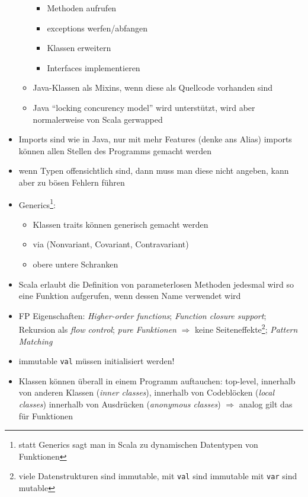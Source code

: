 \begin{itemize}
\begin{itemize}
\begin{itemize}
      \item Methoden aufrufen
      \item exceptions werfen/abfangen
      \item Klassen erweitern
      \item Interfaces implementieren
    \end{itemize}    
    \item Java-Klassen als Mixins, wenn diese als Quellcode vorhanden
    sind
    \item Java \enquote{locking \und concurency model} wird unterstützt, wird
    aber normalerweise von Scala gerwapped
  \end{itemize}
  \item Imports sind wie in Java, nur mit mehr Features (denke ans
  Alias) \und imports können allen Stellen des Programms gemacht werden
  \item wenn Typen offensichtlich sind, dann muss man diese nicht angeben, kann
  aber zu bösen Fehlern führen
  \item Generics\footnote{statt Generics sagt man in Scala zu 
  dynamischen Datentypen von Funktionen }:
  \begin{itemize}
    \item Klassen \und traits können generisch gemacht werden
    \item via  (Nonvariant, Covariant, Contravariant)
    \item obere \und untere Schranken
  \end{itemize}
  \item Scala erlaubt die Definition von parameterlosen Methoden \und jedesmal
  wird so eine Funktion aufgerufen, wenn dessen Name verwendet wird
  \item FP Eigenschaften: \textit{Higher-order functions}; 
  \textit{Function closure support}; Rekursion als \textit{flow control}; 
  \textit{pure Funktionen} $\Rightarrow$ keine 
  Seiteneffekte\footnote{viele Datenstrukturen sind immutable, mit 
  \texttt{val} sind immutable \und mit \texttt{var} sind mutable};
  \textit{Pattern Matching}
  \item immutable \texttt{val} müssen initialisiert werden!  
  \item Klassen können überall in einem Programm auftauchen: top-level,
  innerhalb von anderen Klassen (\textit{inner classes}), innerhalb von
  Codeblöcken (\textit{local classes}) \und innerhalb von Ausdrücken 
  (\textit{anonymous classes}) $\Rightarrow$ analog gilt das für Funktionen

\end{itemize}
